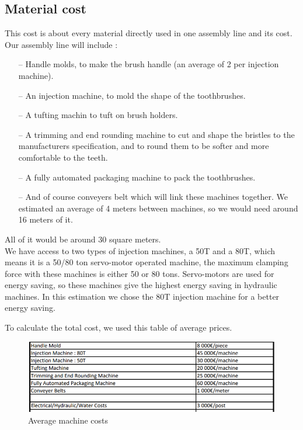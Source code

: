 \subsection{Material cost}
This cost is about every material directly used in one assembly line and its cost.
Our assembly line will include : \\
\begin{itemize}
	\item[--] Handle molds, to make the brush handle (an average of 2 per injection machine).
	\item[--] An injection machine, to mold the shape of the toothbrushes.
	\item[--] A tufting machin to tuft on brush holders.
	\item[--] A trimming and end rounding machine to cut and shape the bristles to the manufacturers specification, and to round them to be softer and more comfortable to the teeth.
	\item[--] A fully automated packaging machine to pack the toothbrushes.
	\item[--] And of course conveyers belt which will link these machines together. We estimated an average of 4 meters between machines, so we would need around 16 meters of it. \\
\end{itemize}

All of it would be around 30 square meters. \\
We have access to two types of injection machines, a 50T and a 80T, which means it is a 50/80 ton servo-motor operated machine, the maximum clamping force with these machines is either 50 or 80 tons. Servo-motors are used for energy saving, so these machines give the highest energy saving in hydraulic machines. In this estimation we chose the 80T injection machine for a better energy saving.

To calculate the total cost, we used this table of average prices. \clearpage

\begin{figure}[h]

	\centering
	\includegraphics[scale=0.9]{Img/averageMachineCost.png}
	\caption{Average machine costs}

\end{figure}

